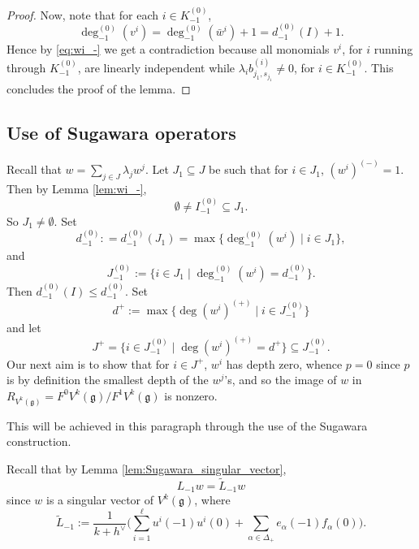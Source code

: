 \documentclass[11pt]{article}
\numberwithin{equation}{section}
\let\oldvee\vee
\renewcommand{\vee}{{\scriptscriptstyle\oldvee}}
\let\al\alpha
\newcommand \g{\mathfrak g}
\theoremstyle{definition}
\begin{document}
\begin{proof}
Now, note that for each $i \in K_{-1}^{(0)}$,
\[
\deg_{-1}^{(0)}(v^{i})=\deg_{-1}^{(0)}(\bar w^{i})+1 = d_{-1}^{(0)}(I) +1.
\]
Hence by \eqref{eq:wi_-} we get a contradiction because all monomials
$v^{i}$, for $i$ running through $K_{-1}^{(0)}$, are linearly independent
while $\lambda_i b_{j_1,s_{j_1}}^{(i)} \not=0$, for $i\in K_{-1}^{(0)}$.
This concludes the proof of the lemma.
\end{proof}

\subsection{Use of Sugawara operators}
\label{sub:Sugawara operators}
Recall that $w = \sum_{j \in J} \lambda_j w^j$.
Let $J_1\subseteq J$ be such that for $i\in J_1$, $(w^i)^{(-)}=1$. Then by Lemma \ref{lem:wi_-},
\[
\emptyset \neq I_{-1}^{(0)}\subseteq J_1.
\]
So $J_1\neq \emptyset.$
Set
\[
{d}_{-1}^{(0)}: = {d}_{-1}^{(0)} (J_1) = \max\{\deg_{-1}^{(0)}(w^i) \mid i \in J_1\},
\]
and
\[
J_{-1}^{(0)} := \{ i\in J_1 \mid \deg_{-1}^{(0)}(w^i)= {d}_{-1}^{(0)}\}.
\]
Then $d_{-1}^{(0)}(I)\leq {d}_{-1}^{(0)}$. Set
\[
d^{+} := \max\{\deg (w^{i})^{(+)} \mid i \in J_{-1}^{(0)} \}
\]
and let
\[
J^+= \{i \in J_{-1}^{(0)} \mid \deg (w^{i})^{(+)}= d^{+} \}\subseteq J_{-1}^{(0)}.
\]
Our next aim is to show that for $i\in J^+$,
$w^{i}$ has depth zero, whence $p=0$ since $p$ is by definition
the smallest depth of the $w^j$'s, and so
the image of $w$ in
$R_{V^k(\g)} = F^0 V^k(\g)/ F^1 V^k(\g)$ is nonzero.

This will be achieved in this paragraph through the use of
the Sugawara construction.

Recall that
by Lemma \ref{lem:Sugawara_singular_vector},
\[
L_{-1} w=\tilde{L}_{-1} w
\]
since $w$ is a singular vector of $V^k(\g)$, where
\begin{equation*}
{\tilde{L}_{-1}:=\dfrac{1}{k+h^\vee} \biggl(\sum_{i=1}^{\ell}u^i(-1)u^i(0)
+\sum_{\al\in{\Delta}_{+}}e_{\al}(-1)f_{\al}(0)\biggr)}.
\end{equation*}
\end{document}
